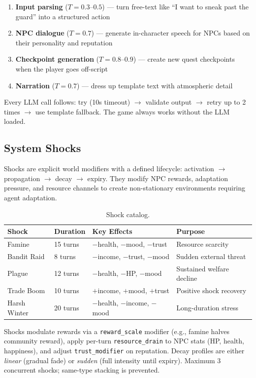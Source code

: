 \begin{enumerate}
    \item \textbf{Input parsing} ($T = 0.3$--$0.5$) --- turn free-text like ``I want to sneak past the guard'' into a structured action
    \item \textbf{NPC dialogue} ($T = 0.7$) --- generate in-character speech for NPCs based on their personality and reputation
    \item \textbf{Checkpoint generation} ($T = 0.8$--$0.9$) --- create new quest checkpoints when the player goes off-script
    \item \textbf{Narration} ($T = 0.7$) --- dress up template text with atmospheric detail
\end{enumerate}

Every LLM call follows: try (10s timeout) $\to$ validate output $\to$ retry up to 2 times $\to$ use template fallback. The game always works without the LLM loaded.

\subsection{System Shocks}

Shocks are explicit world modifiers with a defined lifecycle: activation $\to$ propagation $\to$ decay $\to$ expiry. They modify NPC rewards, adaptation pressure, and resource channels to create non-stationary environments requiring agent adaptation.

\begin{table}[ht]
\centering
\caption{Shock catalog.}
\label{tab:shocks}
\begin{tabular}{@{}llll@{}}
\toprule
Shock & Duration & Key Effects & Purpose \\
\midrule
Famine & 15 turns & $-$health, $-$mood, $-$trust & Resource scarcity \\
Bandit Raid & 8 turns & $-$income, $-$trust, $-$mood & Sudden external threat \\
Plague & 12 turns & $-$health, $-$HP, $-$mood & Sustained welfare decline \\
Trade Boom & 10 turns & $+$income, $+$mood, $+$trust & Positive shock recovery \\
Harsh Winter & 20 turns & $-$health, $-$income, $-$mood & Long-duration stress \\
\bottomrule
\end{tabular}
\end{table}

Shocks modulate rewards via a \texttt{reward\_scale} modifier (e.g., famine halves community reward), apply per-turn \texttt{resource\_drain} to NPC stats (HP, health, happiness), and adjust \texttt{trust\_modifier} on reputation. Decay profiles are either \emph{linear} (gradual fade) or \emph{sudden} (full intensity until expiry). Maximum 3 concurrent shocks; same-type stacking is prevented.
